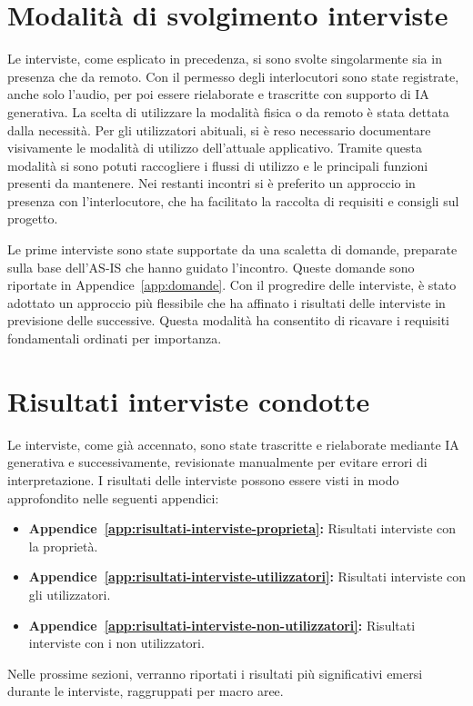 \section{Modalità di svolgimento interviste}
Le interviste, come esplicato in precedenza, si sono svolte singolarmente sia in presenza che da remoto.
Con il permesso degli interlocutori sono state registrate, anche solo l'audio, per poi essere rielaborate e
trascritte con supporto di \ac{IA} generativa.
La scelta di utilizzare la modalità fisica o da remoto è stata dettata dalla necessità.
Per gli utilizzatori abituali, si è reso necessario documentare visivamente le modalità di utilizzo dell'attuale applicativo.
Tramite questa modalità si sono potuti raccogliere i flussi di utilizzo e
le principali funzioni presenti da mantenere.
Nei restanti incontri si è preferito un approccio in presenza con l'interlocutore,
che ha facilitato la raccolta di requisiti e consigli sul progetto.

Le prime interviste sono state supportate da una scaletta di domande,
preparate sulla base dell'AS-IS che hanno guidato l'incontro.
Queste domande sono riportate in Appendice~\ref{app:domande}.
Con il progredire delle interviste, è stato adottato un approccio più flessibile che ha affinato
i risultati delle interviste in previsione delle successive.
Questa modalità ha consentito di ricavare i requisiti fondamentali ordinati per importanza.

\section{Risultati interviste condotte}
Le interviste, come già accennato, sono state trascritte e rielaborate mediante \ac{IA} generativa e
successivamente, revisionate manualmente per evitare errori di interpretazione.
I risultati delle interviste possono essere visti in modo approfondito nelle seguenti appendici:
\begin{itemize}
    \item \textbf{Appendice~\ref{app:risultati-interviste-proprieta}:} Risultati interviste con la proprietà.
    \item \textbf{Appendice~\ref{app:risultati-interviste-utilizzatori}:} Risultati interviste con gli utilizzatori.
    \item \textbf{Appendice~\ref{app:risultati-interviste-non-utilizzatori}:} Risultati interviste con i non utilizzatori.
\end{itemize}
Nelle prossime sezioni, verranno riportati i risultati più significativi emersi durante le interviste,
raggruppati per macro aree.

